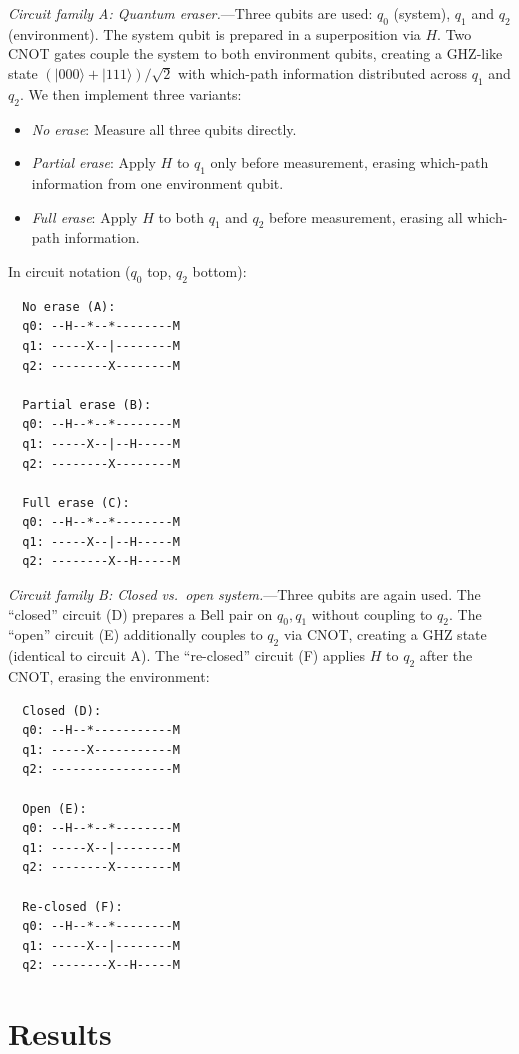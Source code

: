 \documentclass[prl,twocolumn,superscriptaddress,longbibliography,floatfix]{revtex4-2}
\newcommand{\ket}[1]{|#1\rangle}
\begin{document}
\textit{Circuit family A: Quantum eraser.}---Three qubits are used:
$q_0$ (system), $q_1$ and $q_2$ (environment).  The system qubit is
prepared in a superposition via $H$.  Two CNOT gates couple the
system to both environment qubits, creating a GHZ-like state
$(\ket{000}+\ket{111})/\sqrt{2}$ with which-path information
distributed across $q_1$ and $q_2$.  We then implement three
variants:
\begin{itemize}
  \item[\textbf{A}] \textit{No erase}: Measure all three qubits directly.
  \item[\textbf{B}] \textit{Partial erase}: Apply $H$ to $q_1$ only before measurement, erasing which-path information from one environment qubit.
  \item[\textbf{C}] \textit{Full erase}: Apply $H$ to both $q_1$ and $q_2$ before measurement, erasing all which-path information.
\end{itemize}
In circuit notation ($q_0$ top, $q_2$ bottom):
\begin{verbatim}
  No erase (A):
  q0: --H--*--*--------M
  q1: -----X--|--------M
  q2: --------X--------M

  Partial erase (B):
  q0: --H--*--*--------M
  q1: -----X--|--H-----M
  q2: --------X--------M

  Full erase (C):
  q0: --H--*--*--------M
  q1: -----X--|--H-----M
  q2: --------X--H-----M
\end{verbatim}

\textit{Circuit family B: Closed vs.\ open system.}---Three
qubits are again used.  The ``closed'' circuit (D) prepares a Bell
pair on $q_0,q_1$ without coupling to $q_2$.  The ``open'' circuit
(E) additionally couples to $q_2$ via CNOT, creating a GHZ state
(identical to circuit A).  The ``re-closed'' circuit (F) applies $H$
to $q_2$ after the CNOT, erasing the environment:
\begin{verbatim}
  Closed (D):
  q0: --H--*-----------M
  q1: -----X-----------M
  q2: -----------------M

  Open (E):
  q0: --H--*--*--------M
  q1: -----X--|--------M
  q2: --------X--------M

  Re-closed (F):
  q0: --H--*--*--------M
  q1: -----X--|--------M
  q2: --------X--H-----M
\end{verbatim}

\section{Results}
\end{document}
